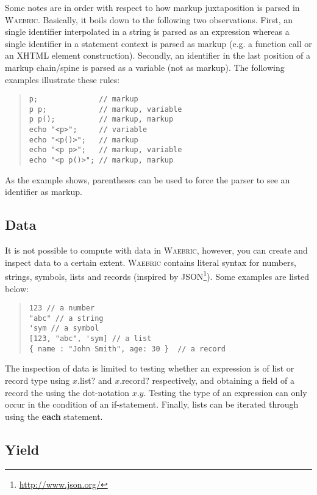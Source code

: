 \documentclass[a4paper]{article}
\def\waebric{\textsc{Waebric}\xspace}
\begin{document}
Some notes are in order with respect to how markup juxtaposition is
parsed in \waebric. Basically, it boils down to the following two
observations. First, an single identifier interpolated in a string is
parsed as an expression whereas a single identifier in a statement
context is parsed as markup (e.g. a function call or an XHTML element
construction). Secondly, an identifier in the last position of a
markup chain/spine is parsed as a variable (not as markup). The
following examples illustrate these rules:
\begin{quote}
\begin{lstlisting}[language=waebric]
p;              // markup
p p;            // markup, variable
p p();          // markup, markup
echo "<p>";     // variable
echo "<p()>";   // markup
echo "<p p>";   // markup, variable
echo "<p p()>"; // markup, markup
\end{lstlisting}
\end{quote}
As the example shows, parentheses can be used to force the parser to
see an identifier as markup.


\subsection{Data}

It is not possible to compute with data in \waebric, however, you can
create and inspect data to a certain extent. \waebric contains literal
syntax for numbers, strings, symbols, lists and records (inspired by
JSON\footnote{\url{http://www.json.org/}}). Some examples are listed below:
\begin{quote}
\begin{lstlisting}[language=waebric]
123 // a number
"abc" // a string
'sym // a symbol
[123, "abc", 'sym] // a list
{ name : "John Smith", age: 30 }  // a record
\end{lstlisting}
\end{quote}

The inspection of data is limited to testing whether an expression is
of list or record type using $x$.list? and $x$.record? respectively,
and obtaining a field of a record the using the dot-notation
$x.y$. Testing the type of an expression can only occur in the
condition of an if-statement. Finally,  lists can be iterated through
using the \textbf{each} statement.

\subsection{Yield}
\end{document}
